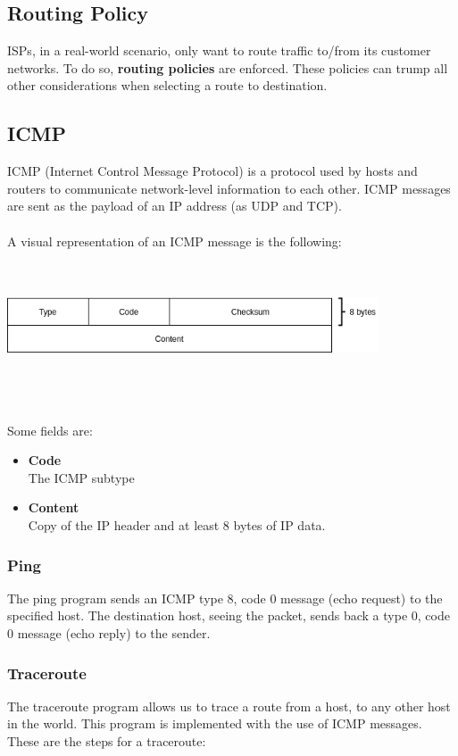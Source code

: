 \documentclass{article}
\begin{document}
\subsection{Routing Policy}
ISPs, in a real-world scenario, only want to route traffic to/from its customer networks. To do so, \textbf{routing policies} are enforced. These policies can trump all other considerations when selecting a route to destination.

\subsection{ICMP}
ICMP (Internet Control Message Protocol) is a protocol used by hosts and routers to communicate network-level information to each other. ICMP messages are sent as the payload of an IP address (as UDP and TCP). \\ \\
A visual representation of an ICMP message is the following: \\ \\ \\
\centerline{\includegraphics[width=11cm]{./assets/icmp.png}} \\ \\ \\
Some fields are:
\begin{itemize}
	\item \textbf{Code}
	\vspace{.2cm} \\
	The ICMP subtype
	
	\item \textbf{Content}
	\vspace{.2cm} \\
	Copy of the IP header and at least 8 bytes of IP data.
\end{itemize}

\subsubsection{Ping}
The ping program sends an ICMP type 8, code 0 message (echo request) to the specified host. The destination host, seeing the packet, sends back a type 0, code 0 message (echo reply) to the sender.

\subsubsection{Traceroute}
The traceroute program allows us to trace a route from a host, to any other host in the world. This program is implemented with the use of ICMP messages. These are the steps for a traceroute:
\end{document}
